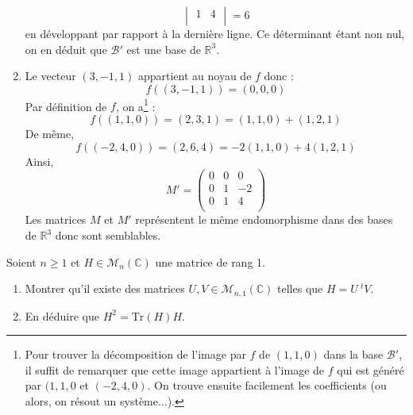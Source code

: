 \documentclass[a4paper,10pt]{report}
\begin{document}
\begin{enumerate}
$$\begin{vmatrix}
 1 & 4\\
\end{vmatrix} = 6 $$
en développant par rapport à la dernière ligne. Ce déterminant étant non nul, on en déduit que $\mathcal{B}'$ est une base de $\mathbb{R}^3$.
\item Le vecteur $(3,-1,1)$ appartient au noyau de $f$ donc :
$$ f((3,-1,1))=(0,0,0)$$
Par définition de $f$, on a\footnote{Pour trouver la décomposition de l'image par $f$ de $(1,1,0)$ dans la base $\mathcal{B}'$, il suffit de remarquer que cette image appartient à l'image de $f$ qui est généré par $(1,1,0$ et $(-2,4,0)$. On trouve ensuite facilement les coefficients (ou alors, on résout un système...).} :
$$ f((1,1,0))=(2,3,1) = (1,1,0) + (1,2,1)$$
De même,
$$ f((-2,4,0))=(2,6,4) = -2(1,1,0) + 4(1,2,1) $$
Ainsi,
$$ M' = \begin{pmatrix}
0 & 0 & 0 \\
0 & 1 & -2 \\
0 & 1 & 4 \\
\end{pmatrix}$$
Les matrices $M$ et $M'$ représentent le même endomorphisme dans des bases de $\mathbb{R}^3$ donc sont semblables.
\end{enumerate}

\begin{Exercice}{} Soient $n \geq 1$ et $H \in \mathcal{M}_n(\mathbb{C})$ une matrice de rang 1.
    \begin{enumerate}
      \item
        Montrer qu'il existe des matrices $U,V \in \mathcal{M}_{n,1}(\mathbb{C})$ telles que $H = U ~^tV$.
      \item En déduire que $H^2 = \textrm{Tr}(H)H$.
 \end{enumerate}
\end{Exercice}

\corr 
\end{document}
